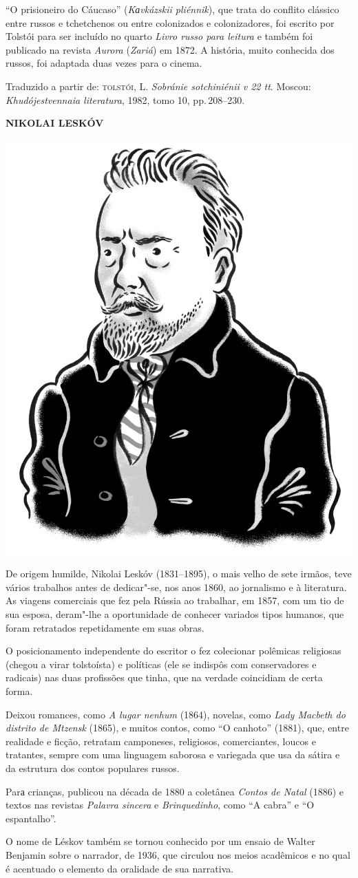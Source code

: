``O prisioneiro do Cáucaso'' (\emph{Kаvkázskii pliénnik}), que trata do
conflito clássico entre russos e tchetchenos ou entre colonizados e
colonizadores, foi escrito por Tolstói para ser incluído no quarto \emph{Livro russo
para leitura} e também foi publicado na revista \emph{Aurora}
(\emph{Zariá}) em 1872. A história, muito conhecida dos russos,
foi adaptada duas vezes para o cinema.

Traduzido a partir de:
\textsc{tolstói}, L. \emph{Sobránie sotchiniénii v 22 tt}. Moscou:
\emph{Khudójestvennaia literatura}, 1982, tomo 10, pp.\,208--230.

\pagebreak
\noindent\textbf{NIKOLAI LESKÓV}\medskip

\noindent\includegraphics[width=.8in]{./imgs/autor5.jpg}

\noindent{}De origem humilde, Nikolai Leskóv (1831--1895), o mais velho de sete
irmãos, teve vários trabalhos antes de dedicar"-se, nos anos 1860, ao
jornalismo e à literatura. As viagens comerciais que fez pela Rússia ao
trabalhar, em 1857, com um tio de sua esposa, deram"-lhe a oportunidade
de conhecer variados tipos humanos, que foram retratados repetidamente
em suas obras.

O posicionamento independente do escritor o fez colecionar polêmicas
religiosas (chegou a virar tolstoísta) e políticas (ele se indispôs com
conservadores e radicais) nas duas profissões que tinha, que na verdade
coincidiam de certa forma.

Deixou romances, como \emph{A lugar nenhum} (1864), novelas, como
\emph{Lady Macbeth do distrito de Mtzensk} (1865), e muitos contos, como
``O canhoto'' (1881), que, entre realidade e ficção, retratam
camponeses, religiosos, comerciantes, loucos e tratantes, sempre com uma
linguagem saborosa e variegada que usa da sátira e da estrutura dos
contos populares russos.

Parа crianças, publicou na década de 1880 a coletânea \emph{Contos de
Natal} (1886) e textos nas revistas \emph{Palavra sincera} e
\emph{Brinquedinho}, como ``A cabra'' e ``O espantalho''.

O nome de Léskov também se tornou conhecido por um ensaio de Walter
Benjamin sobre o narrador, de 1936, que circulou nos meios acadêmicos e
no qual é acentuado o elemento da oralidade de sua narrativa.

